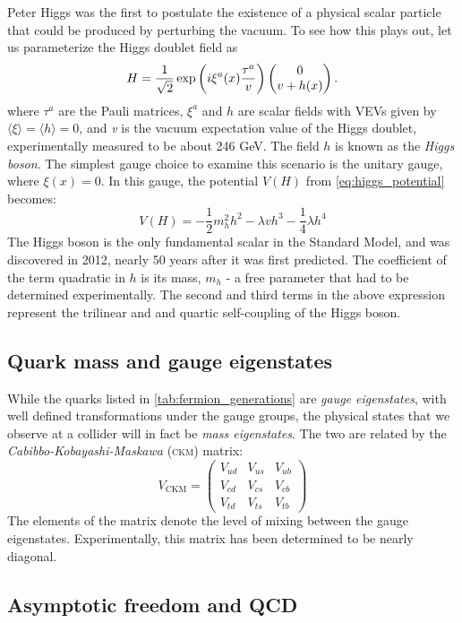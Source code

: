Peter Higgs was the first to postulate the existence of a physical scalar particle that could be produced by perturbing the vacuum. To see how this plays out, let us parameterize the Higgs doublet field as 
\[H = \frac{1}{\sqrt{2}}\exp\left(i\xi^a(x)\frac{\tau^a}{v}\right)\begin{pmatrix} 0 \\ v + h(x)\end{pmatrix}.\]
where $\tau^a$ are the Pauli matrices, $\xi^a$ and $h$ are scalar fields with VEVs given by $\langle\xi\rangle=\langle h\rangle=0$, and \emph{v} is the vacuum expectation value of the Higgs doublet, experimentally measured to be about 246 GeV. The field $h$ is known as the \emph{Higgs boson}. The simplest gauge choice to examine this scenario is the unitary gauge, where $\xi(x)=0$. In this gauge, the potential $V(H)$ from \eqref{eq:higgs_potential} becomes:
\[V(H) = -\frac{1}{2}m_h^2 h^2 - \lambda vh^3 -\frac{1}{4}\lambda h^4\]
The Higgs boson is the only fundamental scalar in the Standard Model, and was discovered in 2012, nearly 50 years after it was first predicted. The coefficient of the term quadratic in $h$ is its mass, $m_h$ - a free parameter that had to be determined experimentally. The second and third terms in the above expression represent the trilinear and and quartic self-coupling of the Higgs boson.
\subsection{Quark mass and gauge eigenstates}
While the quarks listed in \autoref{tab:fermion_generations} are \emph{gauge eigenstates}, with well defined transformations under the gauge groups, the physical states that we observe at a collider will in fact be \emph{mass eigenstates}. The two are related by the \emph{Cabibbo-Kobayashi-Maskawa} (\textsc{ckm}) matrix:
\begin{equation}
  V_\text{CKM} =
  \begin{pmatrix}
    V_{ud} & V_{us} & V_{ub}\\
    V_{cd} & V_{cs} & V_{cb}\\
    V_{td} & V_{ts} & V_{tb}
  \end{pmatrix}
\end{equation}
The elements of the matrix denote the level of mixing between the gauge eigenstates. Experimentally, this matrix has been determined to be nearly diagonal.

\subsection{Asymptotic freedom and QCD}

